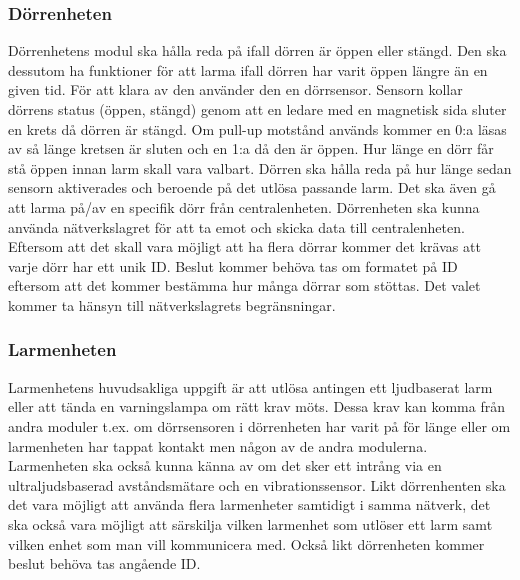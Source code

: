 \documentclass[a4paper]{article}
\begin{document}
\subsubsection{Dörrenheten} 
Dörrenhetens modul ska hålla reda på ifall dörren är öppen eller stängd. Den ska dessutom ha funktioner för att larma ifall dörren har varit öppen längre än en given tid. För att klara av den använder den en dörrsensor. Sensorn kollar dörrens status (öppen, stängd) genom att en ledare med en magnetisk sida sluter en krets då dörren är stängd. Om pull-up motstånd används kommer en 0:a läsas av så länge kretsen är sluten och en 1:a då den är öppen. Hur länge en dörr får stå öppen innan larm skall vara valbart. Dörren ska hålla reda på hur länge sedan sensorn aktiverades och beroende på det utlösa passande larm. Det ska även gå att larma på/av en specifik dörr från centralenheten. 
\newline
\newline
Dörrenheten ska kunna använda nätverkslagret för att ta emot och skicka data till centralenheten. Eftersom att det skall vara möjligt att ha flera dörrar kommer det krävas att varje dörr har ett unik ID. Beslut kommer behöva tas om formatet på ID eftersom att det kommer bestämma hur många dörrar som stöttas. Det valet kommer ta hänsyn till nätverkslagrets begränsningar.

\subsubsection{Larmenheten}
Larmenhetens huvudsakliga uppgift är att utlösa antingen ett ljudbaserat larm eller att tända en varningslampa om rätt krav möts. Dessa krav kan komma från andra moduler t.ex. om dörrsensoren i dörrenheten har varit på för länge eller om larmenheten har tappat kontakt men någon av de andra modulerna. Larmenheten ska också kunna känna av om det sker ett intrång via en ultraljudsbaserad avståndsmätare och en vibrationssensor. 
\newline\newline
Likt dörrenhenten ska det vara möjligt att använda flera larmenheter samtidigt i samma nätverk, det ska också vara möjligt att särskilja vilken larmenhet som utlöser ett larm samt vilken enhet som man vill kommunicera med. Också likt dörrenheten kommer beslut behöva tas angående ID.
\end{document}
